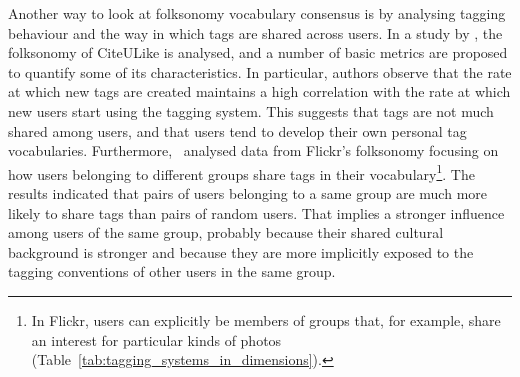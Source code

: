 Another way to look at folksonomy vocabulary consensus is by analysing tagging behaviour and the way in which tags are shared across users.
In a study by \cite{farooq2007}, the folksonomy of CiteULike is analysed, and a number of basic metrics are proposed to quantify some of its characteristics. %
In particular, authors observe that the rate at which new tags are created maintains a high correlation with the rate at which new users start using the tagging system. This suggests that tags are not much shared among users, and that users tend to develop their own personal tag vocabularies.
Furthermore,~\cite{marlow2006} analysed data from Flickr's folksonomy focusing on how users belonging to different groups share tags in their vocabulary\footnote{In Flickr, users can explicitly be members of groups that, for example, share an interest for particular kinds of photos (Table~\ref{tab:tagging_systems_in_dimensions}).}. 
The results indicated that pairs of users belonging to a same group are much more likely to share tags than pairs of random users. That implies a stronger influence among users of the same group, probably because their shared cultural background is stronger and because they are more implicitly exposed to the tagging conventions of other users in the same group.
